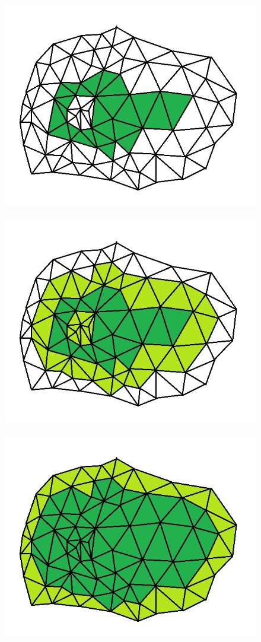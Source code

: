 ﻿\documentclass[12pt, twoside]{article}
\begin{document}
\begin{figure}[h]
\centering
\includegraphics[scale=0.3]{Dila1.jpg}~\includegraphics[scale=0.3]{Dila2.jpg}~\includegraphics[scale=0.3]{Dila3.jpg}


\end{figure}
\end{document}
